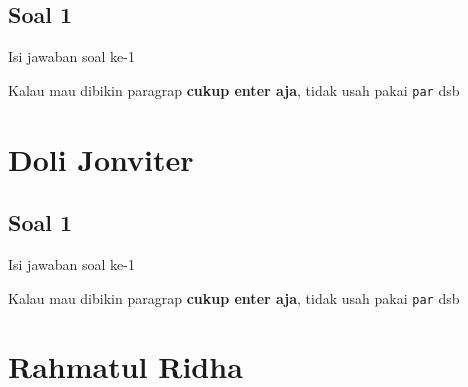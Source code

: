 \subsection{Soal 1}
Isi jawaban soal ke-1

Kalau mau dibikin paragrap \textbf{cukup enter aja}, tidak usah pakai \verb|par| dsb



\section{Doli Jonviter}
\subsection{Soal 1}
Isi jawaban soal ke-1

Kalau mau dibikin paragrap \textbf{cukup enter aja}, tidak usah pakai \verb|par| dsb



\section{Rahmatul Ridha}
